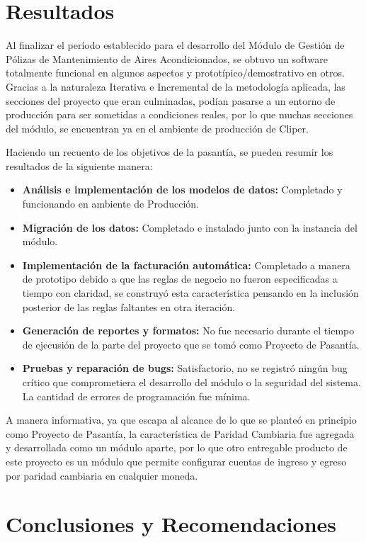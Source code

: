 \documentclass[a4paper, 12pt]{article}
\begin{document}
\newpage
\section{Resultados}
Al finalizar el período establecido para el desarrollo del Módulo de Gestión de Pólizas de Mantenimiento de Aires Acondicionados, se obtuvo un software totalmente funcional en algunos aspectos y prototípico/demostrativo en otros. Gracias a la naturaleza Iterativa e Incremental de la metodología aplicada, las secciones del proyecto que eran culminadas, podían pasarse a un entorno de producción para ser sometidas a condiciones reales, por lo que muchas secciones del módulo, se encuentran ya en el ambiente de producción de Cliper.

Haciendo un recuento de los objetivos de la pasantía, se pueden resumir los resultados de la siguiente manera:
\begin{itemize}
    \item \textbf{Análisis e implementación de los modelos de datos:} Completado y funcionando en ambiente de Producción.
    \item \textbf{Migración de los datos:} Completado e instalado junto con la instancia del módulo.
    \item \textbf{Implementación de la facturación automática:} Completado a manera de prototipo debido a que las reglas de negocio no fueron especificadas a tiempo con claridad, se construyó esta característica pensando en la inclusión posterior de las reglas faltantes en otra iteración.
    \item \textbf{Generación de reportes y formatos:} No fue necesario durante el tiempo de ejecusión de la parte del proyecto que se tomó como Proyecto de Pasantía.
    \item \textbf{Pruebas y reparación de bugs:} Satisfactorio, no se registró ningún bug crítico que comprometiera el desarrollo del módulo o la seguridad del sistema. La cantidad de errores de programación fue mínima.
\end{itemize}

A manera informativa, ya que escapa al alcance de lo que se planteó en principio como Proyecto de Pasantía, la característica de Paridad Cambiaria fue agregada y desarrollada como un módulo aparte, por lo que otro entregable producto de este proyecto es un módulo que permite configurar cuentas de ingreso y egreso por paridad cambiaria en cualquier moneda.

\newpage
\section{Conclusiones y Recomendaciones}
\end{document}
